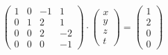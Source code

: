 \begin{ejem}
              $$\begin{pmatrix}
             1&0&-1&1\\
              0&1&2 &1\\
              0&0&2&-2\\
              0&0&0&-1
              \end{pmatrix}
              \cdot
              \begin{pmatrix}
              x\\
              y\\
              z\\
              t
              \end{pmatrix}
              =\begin{pmatrix}
              1\\
              2\\
              0\\
              0
              \end{pmatrix}$$
              
            \end{ejem}
